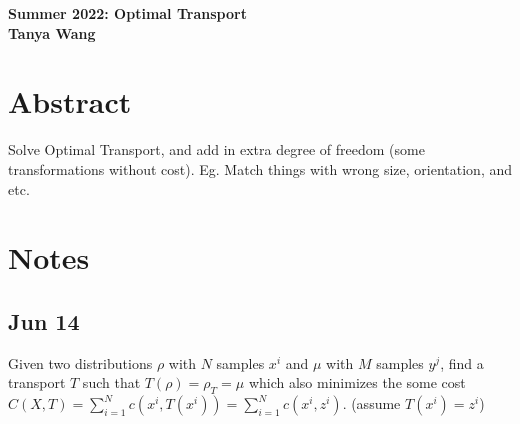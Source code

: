 \documentclass[11pt]{article}
\begin{document}
\begin{center}
\vspace*{-2cm}

\end{center}
\vspace*{.5cm}
\begin{center}
\large \textbf{%
Summer 2022: Optimal Transport}\\
\large \textbf{%
Tanya Wang}\\
\end{center}

\section{Abstract}
Solve Optimal Transport, and add in extra degree of freedom (some transformations without cost). Eg. Match things with wrong size, orientation, and etc.

\section{Notes}
\subsection{Jun 14}
Given two distributions $\rho$ with $N$ samples $x^i$ and $\mu$ with $M$ samples $y^j$, find a transport $T$ such that $T(\rho) = \rho_T = \mu$ which also minimizes the some cost $C(X,T) = \sum_{i=1}^N c(x^i, T(x^i)) = \sum_{i=1}^N c(x^i, z^i)$. (assume $T(x^i) = z^i$)
\end{document}
